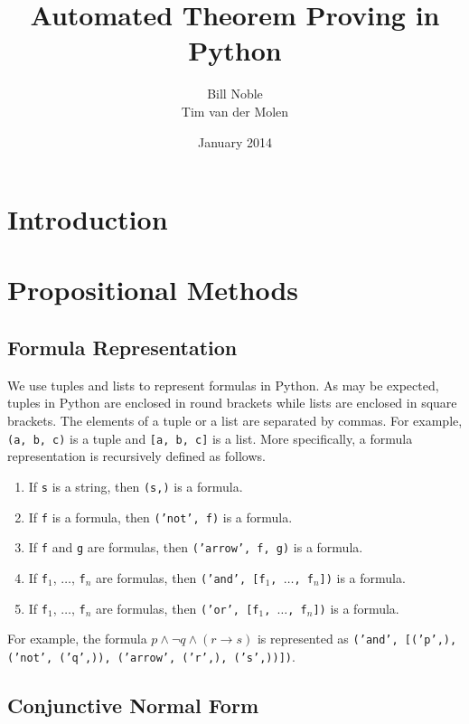 \documentclass[a4paper,notitlepage]{scrartcl}
\title{Automated Theorem Proving in Python}
\author{Bill Noble\\ Tim van der Molen}
\date{January 2014}
\begin{document}
\maketitle

\section{Introduction}

\section{Propositional Methods}

\subsection{Formula Representation}

We use tuples and lists to represent formulas in Python.
As may be expected, tuples in Python are enclosed in round brackets while lists
are enclosed in square brackets.
The elements of a tuple or a list are separated by commas.
For example, \texttt{(a, b, c)} is a tuple and \texttt{[a, b, c]} is a list.
More specifically, a formula representation is recursively defined as follows.

\begin{enumerate}

\item
If \texttt{s} is a string, then \texttt{(s,)} is a formula.

\item
If \texttt{f} is a formula, then \texttt{('not', f)} is a formula.

\item
If \texttt{f} and \texttt{g} are formulas, then \texttt{('arrow', f, g)} is a
formula.

\item
If \texttt{f}$_1$, $\ldots$, \texttt{f}$_n$ are formulas, then \texttt{('and',
[f$_1$, $\ldots$, f$_n$])} is a formula.

\item
If \texttt{f}$_1$, $\ldots$, \texttt{f}$_n$ are formulas, then \texttt{('or',
[f$_1$, $\ldots$, f$_n$])} is a formula.
\end{enumerate}

\noindent
For example, the formula $p \land \lnot q \land (r \to s)$ is represented as
\texttt{('and', [('p',), ('not', ('q',)), ('arrow', ('r',), ('s',))])}.


\subsection{Conjunctive Normal Form}
\end{document}
